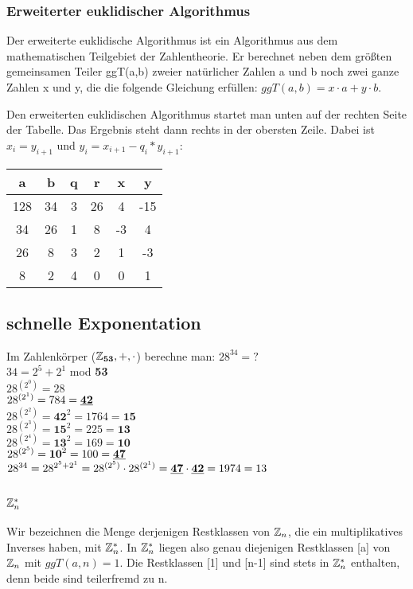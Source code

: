 \subsubsection{Erweiterter euklidischer Algorithmus}
Der erweiterte euklidische Algorithmus ist ein Algorithmus aus dem mathematischen Teilgebiet der Zahlentheorie. Er berechnet neben dem größten gemeinsamen Teiler ggT(a,b) zweier natürlicher Zahlen a und b noch zwei ganze Zahlen x und y, die die folgende Gleichung erfüllen: $ggT(a,b) = x \cdot a + y \cdot b$. 

Den erweiterten euklidischen Algorithmus startet man unten auf der rechten Seite der Tabelle. Das Ergebnis steht dann rechts in der obersten Zeile. Dabei ist $x_i=y_{i+1}$ und $y_i = x_{i+1} - q_i * y_{i+1}$:

\begin{tabular}{|c|c|c|c||c|c|}
\hline a & b & q & r & x & y \\ 
\hline 128 & 34 & 3 & 26 & 4 & -15 \\ 
\hline 34 & 26 & 1 & 8 & -3 & 4 \\ 
\hline 26 & 8 & 3 & 2 & 1 & -3 \\ 
\hline 8 & 2 & 4 & 0 & 0 & 1 \\ 
\hline 
\end{tabular} 

\subsection{schnelle Exponentation}
Im Zahlenkörper ($\mathbb{Z}_{\textbf{53}},+,\cdot$) berechne man:
$28^{34}=?$\\
$34=2^5 + 2^1$ mod \textbf{53}\\
$28^{(2^0)} = 28$\\
$28^{(2^1)} = 784 = \textbf{\underline{42}}$\\
$28^{(2^2)} = \textbf{42}^2 = 1764 = \textbf{15}$\\
$28^{(2^3)} = \textbf{15}^2 = 225 = \textbf{13}$\\
$28^{(2^4)} = \textbf{13}^2 = 169 = \textbf{10}$\\
$28^{(2^5)} = \textbf{10}^2 = 100 = \textbf{\underline{47}}$\\
$28^{34} = 28^{2^5+2^1}= 28^{(2^5)} \cdot  28^{(2^1)} = \textbf{\underline{47}} \cdot  \textbf{\underline{42}} = 1974 = 13$

\subsection{$\mathbb{Z}_n^*$}
Wir bezeichnen die Menge derjenigen Restklassen von $\mathbb{Z}_n$, die ein multiplikatives Inverses haben, mit $\mathbb{Z}_n^*$. In $\mathbb{Z}_n^*$ liegen also genau diejenigen Restklassen [a] von $\mathbb{Z}_n$ mit $ggT(a,n)=1$.
Die Restklassen [1] und [n-1] sind stets in $\mathbb{Z}_n^*$ enthalten, denn beide sind teilerfremd zu n. 

